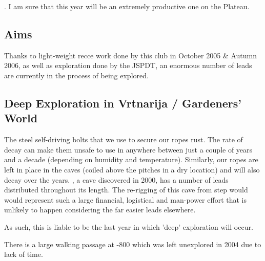. I am sure that this year will be an extremely productive one on the  Plateau.


\subsection{Aims}

Thanks to light-weight recce work done by this club in October 2005 \& Autumn 2006, as well as exploration done by the JSPDT, an enormous number of leads are currently in the process of being explored.


\subsection{Deep Exploration in Vrtnarija / Gardeners' World}

The steel self-driving bolts that we use to secure our ropes rust. The rate of decay can make them unsafe to use in anywhere between just a couple of years and a decade (depending on humidity and temperature). Similarly, our ropes are left in place in the caves (coiled above the pitches in a dry location) and will also decay over the years. , a cave discovered in 2000, has a number of leads distributed throughout its length. The re-rigging of this cave from step would would represent such a large financial, logistical and man-power effort that is unlikely to happen considering the far easier leads elsewhere.

As such, this is liable to be the last year in which 'deep' exploration will occur.

There is a large walking passage at -800 which was left unexplored in 2004 due to lack of time.

